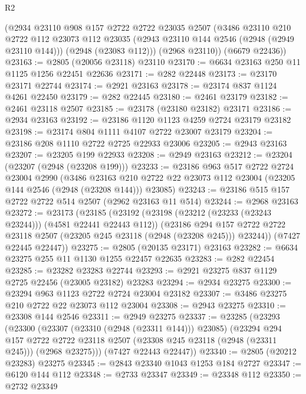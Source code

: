 \begin{lexlean}{R2}
\begin{coremodule}
      (@2934
        @23110
        @908
        @157
        @2722
        @2722
        @23035
        @2507
        (@3486
          @23110
          @210
          @2722
          @112
          @23073
          @112
          @23035
          (@2943 @23110 @144 @2546 (@2948 (@2949 @23110 @144)))
          (@2948 (@23083 @112)))
        (@2968 @23110))
      (@6679 @22436))
@23163 := @2805 (@20056 @23118) @23110
@23170 := @6634 @23163 @250 @11 @1125 @1256 @22451 @22636
@23171 := @282 @22448
@23173 := @23170 @23171 @22744
@23174 := @2921 @23163
@23178 := @23174 @837 @1124 @4261 @22450
@23179 := @282 @22445
@23180 := @2461 @23179
@23182 := @2461 @23118 @2507
@23185 := @23178 (@23180 @23182) @23171
@23186 := @2934 @23163
@23192 := @23186 @1120 @1123 @4259 @2724 @23179 @23182
@23198 := @23174 @804 @1111 @4107 @2722 @23007 @23179
@23204 := @23186 @208 @1110 @2722 @2725 @22933 @23006
@23205 := @2943 @23163
@23207 := @23205 @199 @22933
@23208 := @2949 @23163
@23212 := @23204 (@23207 (@2948 (@23208 @199)))
@23233 := @23186
    @963
    @517
    @2722
    @2724
    @23004
    @2990
    (@3486
      @23163
      @210
      @2722
      @22
      @23073
      @112
      @23004
      (@23205 @144 @2546 (@2948 (@23208 @144)))
      @23085)
@23243 := @23186 @515 @157 @2722 @2722 @514 @2507 (@2962 @23163 @11 @514)
@23244 := @2968 @23163
@23272 := @23173
    (@23185
      (@23192
        (@23198 (@23212 (@23233 (@23243 @23244))) (@4581 @22441 @22443 @112))
        (@23186
          @294
          @157
          @2722
          @2722
          @23118
          @2507
          (@23205 @245 @23118 (@2948 (@23208 @245)))
          @23244))
      (@7427 @22445 @22447))
@23275 := @2805 (@20135 @23171) @23163
@23282 := @6634 @23275 @255 @11 @1130 @1255 @22457 @22635
@23283 := @282 @22454
@23285 := @23282 @23283 @22744
@23293 := @2921 @23275 @837 @1129 @2725 @22456 (@23005 @23182) @23283
@23294 := @2934 @23275
@23300 := @23294 @963 @1123 @2722 @2724 @23004 @23182
@23307 := @3486 @23275 @210 @2722 @22 @23073 @112 @23004
@23308 := @2943 @23275
@23310 := @23308 @144 @2546
@23311 := @2949 @23275
@23337 := @23285
    (@23293
      (@23300
        (@23307 (@23310 (@2948 (@23311 @144))) @23085)
        (@23294
          @294
          @157
          @2722
          @2722
          @23118
          @2507
          (@23308 @245 @23118 (@2948 (@23311 @245)))
          (@2968 @23275)))
      (@7427 @22443 @22447))
@23340 := @2805 (@20212 @23283) @23275
@23345 := @2843 @23340 @1043 @1253 @184 @2727
@23347 := @6120 @144 @112
@23348 := @2733 @23347
@23349 := @23348 @112
@23350 := @2732 @23349

\end{coremodule}
\end{lexlean}
